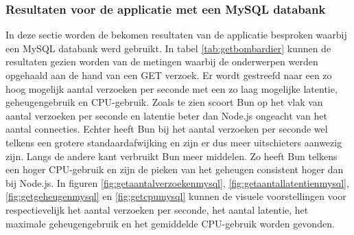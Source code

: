 \subsubsection{Resultaten voor de applicatie met een MySQL databank}
In deze sectie worden de bekomen resultaten van de applicatie besproken waarbij een MySQL databank werd gebruikt.
In tabel \ref{tab:getbombardier} kunnen de resultaten gezien worden van de metingen waarbij de onderwerpen werden opgehaald aan de hand van een GET verzoek.
Er wordt gestreefd naar een zo hoog mogelijk aantal verzoeken per seconde met een zo laag mogelijke latentie, geheugengebruik en CPU-gebruik.
Zoals te zien scoort Bun op het vlak van aantal verzoeken per seconde en latentie beter dan Node.js ongeacht van het aantal connecties. 
Echter heeft Bun bij het aantal verzoeken per seconde wel telkens een grotere standaardafwijking en zijn er dus meer uitschieters aanwezig zijn.
Langs de andere kant verbruikt Bun meer middelen. Zo heeft Bun telkens een hoger CPU-gebruik en zijn de pieken van het geheugen consistent hoger dan bij Node.js.
In figuren \ref{fig:getaantalverzoekenmysql}, \ref{fig:getaantallatentienmysql}, \ref{fig:getgeheugenmysql} en \ref{fig:getcpumysql} kunnen de visuele voorstellingen 
voor respectievelijk het aantal verzoeken per seconde, het aantal latentie, het maximale geheugengebruik en het gemiddelde CPU-gebruik worden gevonden.

